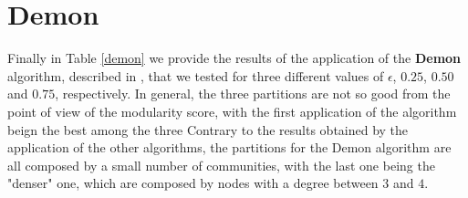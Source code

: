 
\section{Demon} %
\label{sec:demon}
    Finally in Table \ref{demon} we provide the results of the application of the \textbf{Demon} algorithm,
    described in \cite{demon}, that we tested for three different values of $\epsilon$, $0.25$, $0.50$ and $0.75$,
    respectively. In general, the three partitions are not so good from the point of view of the modularity score,
    with the first application of the algorithm beign the best among the three
    Contrary to the results obtained by the application of the other algorithms, the partitions for the Demon
    algorithm are all composed by a small number of communities, with the last one being the "denser" one, which
    are composed by nodes with a degree between $3$ and $4$.

    \begin{table}[H]
        \centering
        \begin{subtable}{\textwidth}
        \end{subtable}
        \caption{Evaluation of the partition obtained by the application of the Demon algorithm.}
        \label{demon}
    \end{table}



